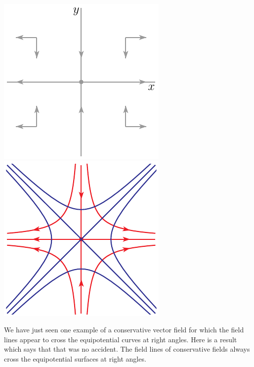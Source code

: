 \begin{eg}
\begin{enumerate}[(a)]
\begin{efig}
\begin{center}
    \includegraphics{phaseHyperbola.pdf}\qquad
    \includegraphics{phaseHyperbola3.pdf}
\end{center}
\end{efig}

\end{enumerate}
\end{eg}


We have just seen one example of a conservative vector field for which the
field lines appear to cross the equipotential curves at right angles.
Here is a result which says that that was no accident. The field lines of
conservative fields always cross the equipotential surfaces 
at right angles. 

